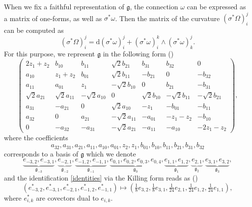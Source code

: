 \documentclass{amsart}
\theoremstyle{plain}
\theoremstyle{definition}
\theoremstyle{remark}
\newcommand{\mfk}[1]{\mathfrak{#1}}
\newcommand{\di}{\mathrm{d}}
\begin{document}
When we fix a faithful representation of $\mfk{g}$, the connection $\omega$ can be expressed as a matrix of one-forms, as well as $\sigma^*\omega$. Then the matrix of the curvature $(\sigma^*\Omega)_i^j$ can be computed as
\begin{equation}\label{curvature_computation}
    (\sigma^*\Omega)_i^j = \di (\sigma^*\omega)_i^j + (\sigma^*\omega)_i^k \wedge (\sigma^*\omega)_k^j.
\end{equation}
For this purpose, we represent $\mfk{g}$ in the following form (\cite[p.]{dt2022})
%
\[ \begin{pmatrix}
   2z_1 + z_2 & b_{10} & b_{11} & \sqrt{2} b_{21} & b_{31} & b_{32} & 0 \\
   a_{10} & z_1 + z_2 & b_{01} & \sqrt{2} b_{11} & - b_{21} & 0 & -b_{32} \\
   a_{11} & a_{01} & z_1 & -\sqrt{2} b_{10} & 0 & b_{21} & -b_{31} \\
   \sqrt{2} a_{21} & \sqrt{2} a_{11} & -\sqrt{2} a_{10} & 0 & \sqrt{2} b_{10} & -\sqrt{2} b_{11} & -\sqrt{2} b_{21} \\
   a_{31} & -a_{21} & 0 & \sqrt{2} a_{10} & -z_1 & -b_{01} & -b_{11} \\
   a_{32} & 0 & a_{21} & -\sqrt{2} a_{11} & -a_{01} & -z_1 - z_2 & -b_{10} \\
   0 & -a_{32} & -a_{31} & -\sqrt{2} a_{21} & -a_{11} & -a_{10} & -2z_1 - z_2
\end{pmatrix}, \]
%
where the coefficients
\[ a_{32}, a_{31}, a_{21}, a_{11}, a_{10}, a_{01}, z_2, z_1, b_{01}, b_{10}, b_{11}, b_{21}, b_{31}, b_{32} \]
corresponds to a basis of $\mfk{g}$ which we denote
\begin{equation}\label{basis_g}
    \underbrace{e_{-3,2}, e_{-3,1}}_{\mfk{g}_{-3}}, \underbrace{e_{-2,1}}_{\mfk{g}_{-2}}, \underbrace{e_{-1,2}, e_{-1,1}}_{\mfk{g}_{-1}}, \underbrace{e_{0,1}, e_{0,2}, e_{0,3}, e_{0,4}}_{\mfk{g}_{0}}, \underbrace{e_{1,1}, e_{1,2}}_{\mfk{g}_{1}}, \underbrace{e_{2,1}}_{\mfk{g}_{2}}, \underbrace{e_{3,1}, e_{3,2}}_{\mfk{g}_{3}},
\end{equation}
and the identification \eqref{identities} via the Killing form reads as (\cite[p.~6]{dt2022})
\begin{equation}\label{killing_identity}
    (e_{-3,2}^*, e_{-3,1}^*, e_{-2,1}^*, e_{-1,2}^*, e_{-1,1}^*) \mapsto (\tfrac{1}{8}e_{3,2}, \tfrac{1}{8}e_{3,1}, \tfrac{1}{24}e_{2,1}, \tfrac{1}{24}e_{1,2}, \tfrac{1}{24}e_{1,1}),
\end{equation}
where $e_{i,k}^*$ are covectors dual to $e_{i,k}$.
\end{document}
